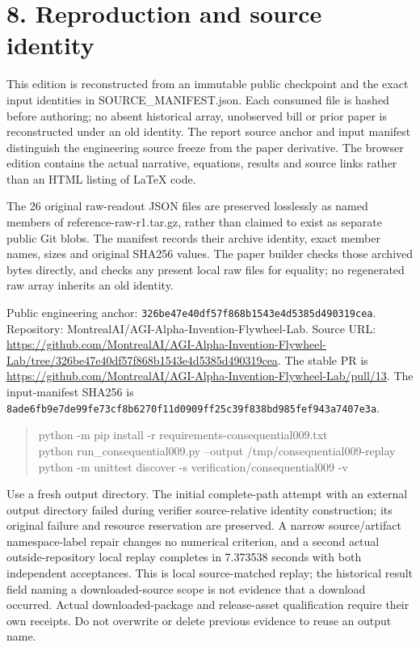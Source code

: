 \documentclass[10pt,letterpaper]{article}
\begin{document}
\section*{\color{accent}8. Reproduction and source identity}
This edition is reconstructed from an immutable public checkpoint and the exact input identities in SOURCE\_\allowbreak{}MANIFEST.json. Each consumed file is hashed before authoring; no absent historical array, unobserved bill or prior paper is reconstructed under an old identity. The report source anchor and input manifest distinguish the engineering source freeze from the paper derivative. The browser edition contains the actual narrative, equations, results and source links rather than an HTML listing of LaTeX code.\par
The 26 original raw-readout JSON files are preserved losslessly as named members of reference-raw-r1.tar.gz, rather than claimed to exist as separate public Git blobs. The manifest records their archive identity, exact member names, sizes and original SHA256 values. The paper builder checks those archived bytes directly, and checks any present local raw files for equality; no regenerated raw array inherits an old identity.\par
Public engineering anchor: \texttt{326be47e40df\allowbreak{}57f868b1543e\allowbreak{}4d5385d49031\allowbreak{}9cea}. Repository: MontrealAI/AGI-Alpha-Invention-Flywheel-Lab. Source URL: \url{https://github.com/MontrealAI/AGI-Alpha-Invention-Flywheel-Lab/tree/326be47e40df57f868b1543e4d5385d490319cea}. The stable PR is \url{https://github.com/MontrealAI/AGI-Alpha-Invention-Flywheel-Lab/pull/13}. The input-manifest SHA256 is \texttt{8ade6fb9e7de\allowbreak{}99fe73cf8b62\allowbreak{}70f11d0909ff\allowbreak{}25c39f838bd9\allowbreak{}85fef943a740\allowbreak{}7e3a}.\par
\begin{quote}\footnotesize\ttfamily\raggedright python -m pip install -r requirements-consequential009.txt\\python run\_\allowbreak{}consequential009.py --output /tmp/consequential009-replay\\python -m unittest discover -s verification/consequential009 -v\end{quote}
Use a fresh output directory. The initial complete-path attempt with an external output directory failed during verifier source-relative identity construction; its original failure and resource reservation are preserved. A narrow source/artifact namespace-label repair changes no numerical criterion, and a second actual outside-repository local replay completes in 7.373538 seconds with both independent acceptances. This is local source-matched replay; the historical result field naming a downloaded-source scope is not evidence that a download occurred. Actual downloaded-package and release-asset qualification require their own receipts. Do not overwrite or delete previous evidence to reuse an output name.\par
\end{document}
